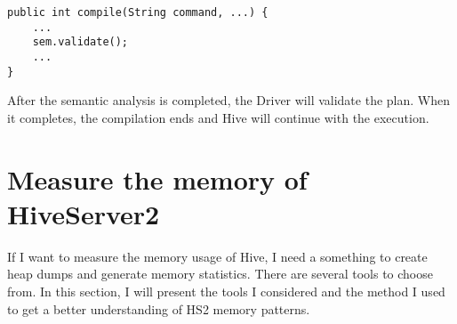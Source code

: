 \begin{lstlisting}
public int compile(String command, ...) {
	...
	sem.validate();
	...
}
\end{lstlisting}

After the semantic analysis is completed, the Driver will validate the plan. When it completes, the compilation ends and Hive will continue with the execution.

\clearpage
\section{Measure the memory of HiveServer2}
If I want to measure the memory usage of Hive, I need a something to create heap dumps and generate memory statistics. There are several tools to choose from. In this section, I will present the tools I considered and the method I used to get a better understanding of HS2 memory patterns.

 